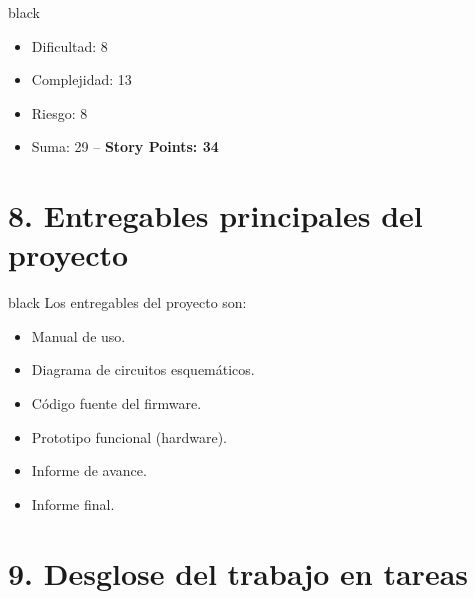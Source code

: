 \documentclass[
11pt, %
]{charter}
\begin{document}
\begin{consigna}{black}
\begin{itemize}
	\begin{itemize}
	\item Dificultad: 8
	\item Complejidad: 13
	\item Riesgo: 8
	\item Suma: 29 -- \textbf{Story Points: 34}
	\end{itemize}   
\end{itemize}


\end{consigna}

\section{8. Entregables principales del proyecto}
\label{sec:entregables}

\begin{consigna}{black}
Los entregables del proyecto son:

\begin{itemize}
	\item Manual de uso.
	\item Diagrama de circuitos esquemáticos.
	\item Código fuente del firmware.
	\item Prototipo funcional (hardware).
	\item Informe de avance.
	\item Informe final.
\end{itemize}

\end{consigna}

\section{9. Desglose del trabajo en tareas}
\label{sec:wbs}
\end{document}
